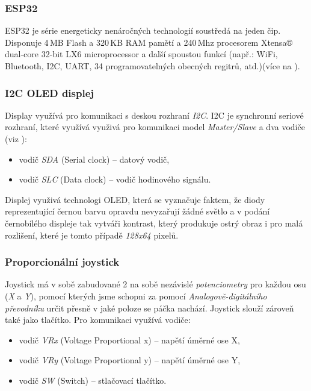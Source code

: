 \documentclass[a4paper, 11pt]{article}
\begin{document}
\subsubsection{ESP32}
ESP32 je série energeticky nenáročných technologií soustředá na jeden čip. Disponuje 4\,MB Flash a 320\,KB RAM
pamětí a 240\,Mhz procesorem Xtensa® dual-core 32-bit LX6 microprocessor a další spoustou funkcí (např.: WiFi, Bluetooth,
I2C, UART, 34 programovatelných obecných regitrů, atd.)(více na \cite{Wikipedia:2023:ESP32}).

\subsubsection{I2C OLED displej}
Display využívá pro komunikaci s deskou rozhraní \emph{I2C}. I2C je synchronní seriové rozhraní, které využívá využivá pro komunikaci
model \emph{Master/Slave} a dva vodiče (viz \cite{Bidlo:2023:SeriovaKomunikace}):
\begin{itemize}
    \item {vodič \emph{SDA} (Serial clock) -- datový vodič,}
    \item {vodič \emph{SLC} (Data clock) -- vodič hodinového signálu.}
\end{itemize}

Displej využivá technologi OLED, která se vyznačuje faktem, že diody reprezentující černou barvu opravdu nevyzařují žádné světlo
a v podání černobílého displeje tak vytváři kontrast, který produkuje ostrý obraz i pro malá rozlišení, které je tomto
případě \emph{128x64} pixelů.


\subsubsection{Proporcionální joystick}
Joystick má v sobě zabudované 2 na sobě nezávislé \emph{potenciometry} pro každou osu (\emph{X} a \emph{Y}), pomocí kterých jsme schopni
za pomocí \emph{Analogově-digitálního převodníku} určit přesně v jaké poloze se páčka nachází. Joystick slouží zároveň také jako tlačítko.
Pro komunikaci využívá vodiče:
\begin{itemize}
    \item {vodič \emph{VRx} (Voltage Proportional x) -- napětí úměrné ose X,}
    \item {vodič \emph{VRy} (Voltage Proportional y) -- napětí úměrné ose Y,}
    \item {vodič \emph{SW} (Switch) -- stlačovací tlačítko.}
\end{itemize}
\end{document}
